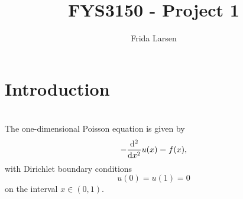 \documentclass[notitlepage, reprint, nofootinbib]{revtex4-1}
\begin{document}
\title{FYS3150 - Project 1}
\author{Frida Larsen}
\maketitle

\section{Introduction}
{\color{red}{Reference code in github repository.}}\\[2mm]
The one-dimensional Poisson equation is given by 
\begin{equation}\label{Poisson}-\dv[2]{x} u(x)=f(x),\end{equation}
with Dirichlet boundary conditions
\begin{equation}\label{Dirichlet}u(0)=u(1)=0\end{equation}
on the interval $x\in (0,1)$.

\end{document}
